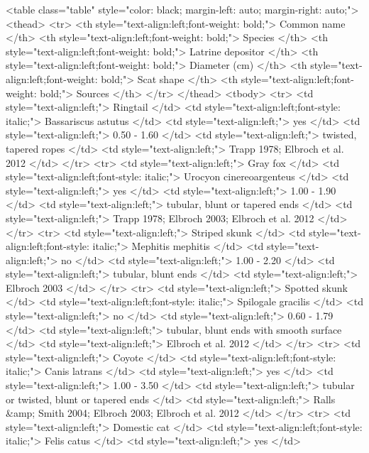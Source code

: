 <table class="table" style="color: black; margin-left: auto; margin-right: auto;">
 <thead>
  <tr>
   <th style="text-align:left;font-weight: bold;"> Common name </th>
   <th style="text-align:left;font-weight: bold;"> Species </th>
   <th style="text-align:left;font-weight: bold;"> Latrine depositor </th>
   <th style="text-align:left;font-weight: bold;"> Diameter (cm) </th>
   <th style="text-align:left;font-weight: bold;"> Scat shape </th>
   <th style="text-align:left;font-weight: bold;"> Sources </th>
  </tr>
 </thead>
<tbody>
  <tr>
   <td style="text-align:left;"> Ringtail </td>
   <td style="text-align:left;font-style: italic;"> Bassariscus astutus </td>
   <td style="text-align:left;"> yes </td>
   <td style="text-align:left;"> 0.50 - 1.60 </td>
   <td style="text-align:left;"> twisted, tapered ropes </td>
   <td style="text-align:left;"> Trapp 1978; Elbroch et al. 2012 </td>
  </tr>
  <tr>
   <td style="text-align:left;"> Gray fox </td>
   <td style="text-align:left;font-style: italic;"> Urocyon cinereoargenteus </td>
   <td style="text-align:left;"> yes </td>
   <td style="text-align:left;"> 1.00 - 1.90 </td>
   <td style="text-align:left;"> tubular, blunt or tapered ends </td>
   <td style="text-align:left;"> Trapp 1978; Elbroch 2003; Elbroch et al. 2012 </td>
  </tr>
  <tr>
   <td style="text-align:left;"> Striped skunk </td>
   <td style="text-align:left;font-style: italic;"> Mephitis mephitis </td>
   <td style="text-align:left;"> no </td>
   <td style="text-align:left;"> 1.00 - 2.20 </td>
   <td style="text-align:left;"> tubular, blunt ends </td>
   <td style="text-align:left;"> Elbroch 2003 </td>
  </tr>
  <tr>
   <td style="text-align:left;"> Spotted skunk </td>
   <td style="text-align:left;font-style: italic;"> Spilogale gracilis </td>
   <td style="text-align:left;"> no </td>
   <td style="text-align:left;"> 0.60 - 1.79 </td>
   <td style="text-align:left;"> tubular, blunt ends with smooth surface </td>
   <td style="text-align:left;"> Elbroch et al. 2012 </td>
  </tr>
  <tr>
   <td style="text-align:left;"> Coyote </td>
   <td style="text-align:left;font-style: italic;"> Canis latrans </td>
   <td style="text-align:left;"> yes </td>
   <td style="text-align:left;"> 1.00 - 3.50 </td>
   <td style="text-align:left;"> tubular or twisted, blunt or tapered ends </td>
   <td style="text-align:left;"> Ralls &amp; Smith 2004; Elbroch 2003; Elbroch et al. 2012 </td>
  </tr>
  <tr>
   <td style="text-align:left;"> Domestic cat </td>
   <td style="text-align:left;font-style: italic;"> Felis catus </td>
   <td style="text-align:left;"> yes </td>
